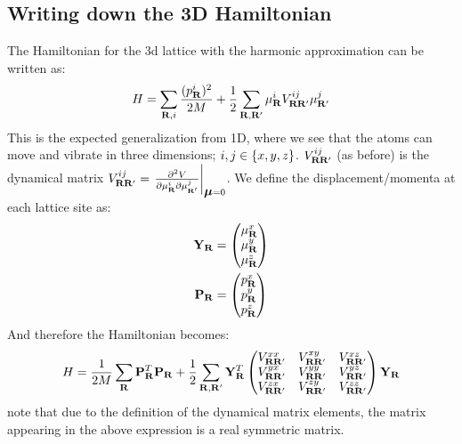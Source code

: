 \subsection{Writing down the 3D Hamiltonian}
The Hamiltonian for the 3d lattice with the harmonic approximation can be written as:
\begin{equation}
    H = \sum_{\mathbf{R}, i}\frac{(p^i_{\mathbf{R}})^2}{2M} + \frac{1}{2}\sum_{\mathbf{R}, \mathbf{R}'}\mu^i_{\mathbf{R}} V_{\mathbf{R}\mathbf{R}'}^{ij}\mu^j_{\mathbf{R}'}
\end{equation}
This is the expected generalization from 1D, where we see that the atoms can move and vibrate in three dimensions; $i, j \in \set{x,y,z}$. $V^{ij}_{\mathbf{R}\mathbf{R}'}$ (as before) is the dynamical matrix $V_{\mathbf{R}\mathbf{R'}}^{ij} = \left.\frac{\partial^2 V}{\partial \mu_{\mathbf{R}}^i \partial \mu_{\mathbf{R}'}^j} \right|_{\mbox{\boldmath$ \mu $} = 0}$. We define the displacement/momenta at each lattice site as:
\begin{equation}
    \begin{split}
        \mathbf{Y}_{\mathbf{R}} &= \begin{pmatrix}\mu_{\mathbf{R}}^x \\ \mu_{\mathbf{R}}^y \\ \mu_{\mathbf{R}}^z\end{pmatrix}
        \\ \mathbf{P}_{\mathbf{R}} &= \begin{pmatrix}p_{\mathbf{R}}^x \\ p_{\mathbf{R}}^y \\ p_{\mathbf{R}}^z\end{pmatrix}
    \end{split}
\end{equation}
And therefore the Hamiltonian becomes:
\begin{equation}
    H = \frac{1}{2M}\sum_{\mathbf{R}}\mathbf{P}^T_{\mathbf{R}} \mathbf{P}_{\mathbf{R}} + \frac{1}{2}\sum_{\mathbf{R},\mathbf{R}'}\mathbf{Y}^T_{\mathbf{R}} \begin{pmatrix}V_{\mathbf{R}\mathbf{R}'}^{xx} & V_{\mathbf{R}\mathbf{R}'}^{xy} & V_{\mathbf{R}\mathbf{R}'}^{xz} \\ V_{\mathbf{R}\mathbf{R}'}^{yx} & V_{\mathbf{R}\mathbf{R}'}^{yy} & V_{\mathbf{R}\mathbf{R}'}^{yz} \\ V_{\mathbf{R}\mathbf{R}'}^{zx} & V_{\mathbf{R}\mathbf{R}'}^{zy} & V_{\mathbf{R}\mathbf{R}'}^{zz}\end{pmatrix} \mathbf{Y}_{\mathbf{R}}
\end{equation}
note that due to the definition of the dynamical matrix elements, the matrix appearing in the above expression is a real symmetric matrix.

